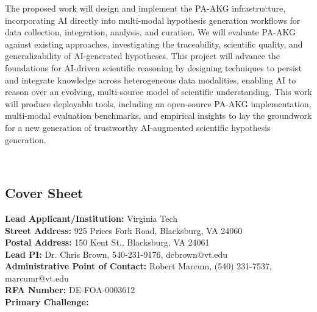 \documentclass{files/proposalnsf}
\begin{document}
The proposed work will design and implement the PA-AKG infrastructure, incorporating AI directly into multi-modal hypothesis generation workflows for data collection, integration, analysis, and curation. We will evaluate PA-AKG against existing approaches, investigating the traceability, scientific quality, and generalizability of AI-generated hypotheses. This project will advance the foundations for AI-driven scientific reasoning by designing techniques to persist and integrate knowledge across heterogeneous data modalities, enabling AI to reason over an evolving, multi-source model of scientific understanding. This work will produce deployable tools, including an open-source PA-AKG implementation, multi-modal evaluation benchmarks, and empirical insights to lay the groundwork for a new generation of trustworthy AI-augmented scientific hypothesis generation.

\newpage
{}

\begin{center}
    \large{\proposalEleven} \\ \vspace{0.5pt}
\end{center}\vspace{-15pt}

\subsection*{Cover Sheet} \vspace{12pt}

\textbf{Lead Applicant/Institution:} Virginia Tech \\

\noindent\textbf{Street Address:} 925 Prices Fork Road, Blacksburg, VA 24060 \\

\noindent\textbf{Postal Address:} 150 Kent St., Blacksburg, VA 24061\\

\noindent\textbf{Lead PI:} Dr. Chris Brown, 540-231-9176, dcbrown@vt.edu \\

\noindent\textbf{Administrative Point of Contact:} Robert Marcum, (540) 231-7537, marcumr@vt.edu \\

\noindent\textbf{RFA Number:} DE-FOA-0003612 \\

\noindent\textbf{Primary Challenge:} \\
\end{document}
